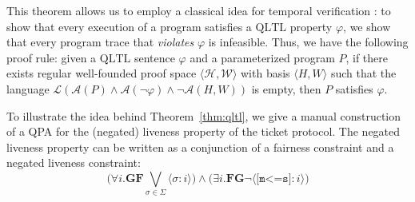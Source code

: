 \documentclass[9pt,nocopyrightspace]{sigplanconf}
\theoremstyle{definition}
\newcommand{\tuple}[1]{\langle #1 \rangle}
\newcommand{\finally}{\textbf{F}}
\newcommand{\globally}{\textbf{G}}
\newcommand{\ic}[2]{{\tuple{#1 : #2}}}
\newcommand{\lang}{\mathcal{L}}
\renewcommand{\phi}{\varphi}
\newcommand{\QLTL}{\text{QLTL}}
\begin{document}
This theorem allows us to employ a classical idea for temporal verification
\cite{Vardi1986}: to show that every execution of a program satisfies a
$\QLTL$ property $\phi$, we show that every program trace that \emph{violates}
$\phi$ is infeasible.  Thus, we have the following proof rule: given a
$\QLTL$ sentence $\phi$ and a parameterized program $P$, if there exists
regular well-founded proof space $\tuple{\mathscr{H},\mathscr{W}}$ with basis
$\tuple{H,W}$ such that the language $\lang(\mathcal{A}(P) \land
\mathcal{A}(\lnot\phi) \land \lnot \mathcal{A}(H,W))$ is empty, then $P$
satisfies $\phi$.

\begin{example}
To illustrate the idea behind Theorem~\ref{thm:qltl}, we give a manual
construction of a QPA for the (negated) liveness property of the ticket
protocol.  The negated liveness property can be written as a conjunction of a
fairness constraint and a negated liveness constraint:
\[\big(\forall i.\globally\finally\bigvee_{\sigma \in \Sigma} \ic{\sigma}{i}\big) \land \big(\exists i.\finally\globally\lnot\ic{\texttt{[m<=s]}}{i}\big)\]


\end{example}
\end{document}
